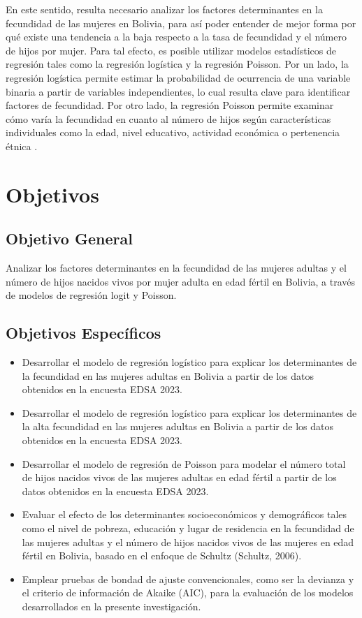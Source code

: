 \documentclass[Royal,times,sageh]{sagej}
\begin{document}
En este sentido, resulta necesario analizar los factores determinantes
en la fecundidad de las mujeres en Bolivia, para así poder entender de
mejor forma por qué existe una tendencia a la baja respecto a la tasa de
fecundidad y el número de hijos por mujer. Para tal efecto, es posible
utilizar modelos estadísticos de regresión tales como la regresión
logística y la regresión Poisson. Por un lado, la regresión logística
permite estimar la probabilidad de ocurrencia de una variable binaria a
partir de variables independientes, lo cual resulta clave para
identificar factores de fecundidad. Por otro lado, la regresión Poisson
permite examinar cómo varía la fecundidad en cuanto al número de hijos
según características individuales como la edad, nivel educativo,
actividad económica o pertenencia étnica \citep{schultz2006fertility}.

\section{Objetivos}\label{objetivos}

\subsection{Objetivo General}\label{objetivo-general}

Analizar los factores determinantes en la fecundidad de las mujeres
adultas y el número de hijos nacidos vivos por mujer adulta en edad
fértil en Bolivia, a través de modelos de regresión logit y Poisson.

\subsection{Objetivos Específicos}\label{objetivos-especuxedficos}

\begin{itemize}
\item
  Desarrollar el modelo de regresión logístico para explicar los
  determinantes de la fecundidad en las mujeres adultas en Bolivia a
  partir de los datos obtenidos en la encuesta EDSA 2023.
\item
  Desarrollar el modelo de regresión logístico para explicar los
  determinantes de la alta fecundidad en las mujeres adultas en Bolivia
  a partir de los datos obtenidos en la encuesta EDSA 2023.
\item
  Desarrollar el modelo de regresión de Poisson para modelar el número
  total de hijos nacidos vivos de las mujeres adultas en edad fértil a
  partir de los datos obtenidos en la encuesta EDSA 2023.
\item
  Evaluar el efecto de los determinantes socioeconómicos y demográficos
  tales como el nivel de pobreza, educación y lugar de residencia en la
  fecundidad de las mujeres adultas y el número de hijos nacidos vivos
  de las mujeres en edad fértil en Bolivia, basado en el enfoque de
  Schultz (Schultz, 2006).
\item
  Emplear pruebas de bondad de ajuste convencionales, como ser la
  devianza y el criterio de información de Akaike (AIC), para la
  evaluación de los modelos desarrollados en la presente investigación.
\end{itemize}
\end{document}

